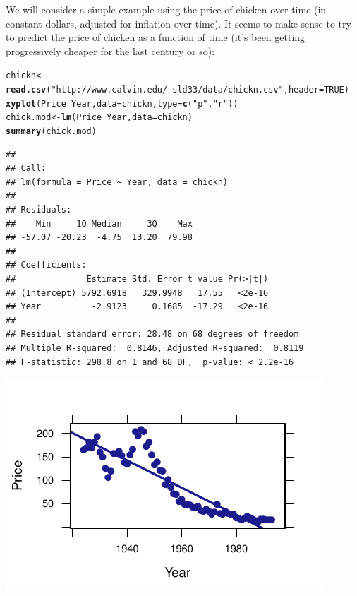 \documentclass[twoside]{book}\usepackage[]{graphicx}\usepackage[]{xcolor}
\makeatletter
\def\maxwidth{ %
  \ifdim\Gin@nat@width>\linewidth
    \linewidth
  \else
    \Gin@nat@width
  \fi
}
\newcommand{\hlnum}[1]{\textcolor[rgb]{0.686,0.059,0.569}{#1}}%
\newcommand{\hlstr}[1]{\textcolor[rgb]{0.192,0.494,0.8}{#1}}%
\newcommand{\hlopt}[1]{\textcolor[rgb]{0,0,0}{#1}}%
\newcommand{\hlstd}[1]{\textcolor[rgb]{0.345,0.345,0.345}{#1}}%
\newcommand{\hlkwb}[1]{\textcolor[rgb]{0.69,0.353,0.396}{#1}}%
\newcommand{\hlkwc}[1]{\textcolor[rgb]{0.333,0.667,0.333}{#1}}%
\newcommand{\hlkwd}[1]{\textcolor[rgb]{0.737,0.353,0.396}{\textbf{#1}}}%
\newenvironment{kframe}{%
 \def\at@end@of@kframe{}%
 \ifinner\ifhmode%
  \def\at@end@of@kframe{\end{minipage}}%
  \begin{minipage}{\columnwidth}%
 \fi\fi%
 \def\FrameCommand##1{\hskip\@totalleftmargin \hskip-\fboxsep
 \colorbox{shadecolor}{##1}\hskip-\fboxsep
     \hskip-\linewidth \hskip-\@totalleftmargin \hskip\columnwidth}%
 \MakeFramed {\advance\hsize-\width
   \@totalleftmargin\z@ \linewidth\hsize
   \@setminipage}}%
 {\par\unskip\endMakeFramed%
 \at@end@of@kframe}
\newenvironment{knitrout}{}{} %
\newcounter{example}[section]
\makeatother
\begin{document}
We will consider a simple example using the price of chicken over time (in constant dollars, adjusted for inflation over time).  It seems to make sense to try to predict the price of chicken as a function of time (it's been getting progressively cheaper for the last century or so):
\begin{knitrout}
\color{fgcolor}\begin{kframe}
\begin{alltt}
\hlstd{chickn} \hlkwb{<-} \hlkwd{read.csv}\hlstd{(}\hlstr{"http://www.calvin.edu/~sld33/data/chickn.csv"}\hlstd{,} \hlkwc{header} \hlstd{=} \hlnum{TRUE}\hlstd{)}
\hlkwd{xyplot}\hlstd{(Price} \hlopt{~} \hlstd{Year,} \hlkwc{data} \hlstd{= chickn,} \hlkwc{type} \hlstd{=} \hlkwd{c}\hlstd{(}\hlstr{"p"}\hlstd{,} \hlstr{"r"}\hlstd{))}
\hlstd{chick.mod} \hlkwb{<-} \hlkwd{lm}\hlstd{(Price} \hlopt{~} \hlstd{Year,} \hlkwc{data} \hlstd{= chickn)}
\hlkwd{summary}\hlstd{(chick.mod)}
\end{alltt}
\begin{verbatim}
## 
## Call:
## lm(formula = Price ~ Year, data = chickn)
## 
## Residuals:
##    Min     1Q Median     3Q    Max 
## -57.07 -20.23  -4.75  13.20  79.98 
## 
## Coefficients:
##              Estimate Std. Error t value Pr(>|t|)
## (Intercept) 5792.6918   329.9948   17.55   <2e-16
## Year          -2.9123     0.1685  -17.29   <2e-16
## 
## Residual standard error: 28.48 on 68 degrees of freedom
## Multiple R-squared:  0.8146,	Adjusted R-squared:  0.8119 
## F-statistic: 298.8 on 1 and 68 DF,  p-value: < 2.2e-16
\end{verbatim}
\end{kframe}

{\centering \includegraphics[width=\maxwidth]{figures/fig-chickn-1} 

}



\end{knitrout}
\end{document}
